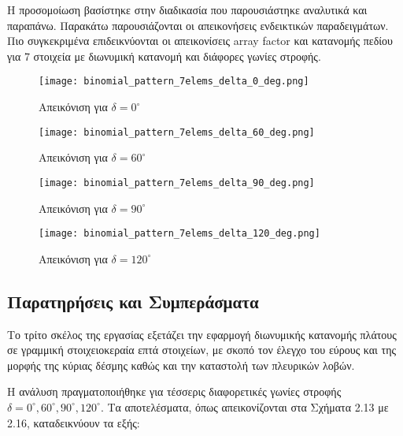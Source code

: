 \documentclass[a4paper,12pt]{report}
\newcommand{\en}{\selectlanguage{english}}
\newcommand{\gr}{\selectlanguage{greek}}
\begin{document}
\hspace{-0.6cm}Η προσομοίωση βασίστηκε στην διαδικασία που παρουσιάστηκε αναλυτικά και παραπάνω. Παρακάτω παρουσιάζονται οι απεικονήσεις ενδεικτικών παραδειγμάτων. Πιο συγκεκριμένα επιδεικνύονται οι απεικονίσεις \en array factor \gr και κατανομής πεδίου για 7 στοιχεία με διωνυμική κατανομή και διάφορες γωνίες στροφής.

\begin{figure}[H]
    \centering
    \begin{minipage}[t]{0.48\textwidth}
        \centering
        \texttt{[image: binomial\_pattern\_7elems\_delta\_0\_deg.png]}
        \caption{Απεικόνιση για \( \delta = 0^\circ \)}
    \end{minipage}
    \hfill
    \begin{minipage}[t]{0.48\textwidth}
        \centering
        \texttt{[image: binomial\_pattern\_7elems\_delta\_60\_deg.png]}
        \caption{Απεικόνιση για \( \delta = 60^\circ \)}
    \end{minipage}

    \vspace{0.4cm}

    \begin{minipage}[t]{0.48\textwidth}
        \centering
        \texttt{[image: binomial\_pattern\_7elems\_delta\_90\_deg.png]}
        \caption{Απεικόνιση για \( \delta = 90^\circ \)}
    \end{minipage}
    \hfill
    \begin{minipage}[t]{0.48\textwidth}
        \centering
        \texttt{[image: binomial\_pattern\_7elems\_delta\_120\_deg.png]}
        \caption{Απεικόνιση για \( \delta = 120^\circ \)}
    \end{minipage}
\end{figure}

\subsection{Παρατηρήσεις και Συμπεράσματα}

Το τρίτο σκέλος της εργασίας εξετάζει την εφαρμογή διωνυμικής κατανομής πλάτους σε γραμμική στοιχειοκεραία επτά στοιχείων, με σκοπό τον έλεγχο του εύρους και της μορφής της κύριας δέσμης καθώς και την καταστολή των πλευρικών λοβών.

\vspace{0.3cm}

\hspace{-0.6cm}Η ανάλυση πραγματοποιήθηκε για τέσσερις διαφορετικές γωνίες στροφής \(\delta = 0^\circ, 60^\circ, 90^\circ, 120^\circ\). Τα αποτελέσματα, όπως απεικονίζονται στα Σχήματα 2.13 με 2.16, καταδεικνύουν τα εξής:
\end{document}
